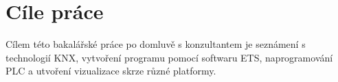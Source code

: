 \chapter*{Cíle práce}
{}

Cílem této bakalářské práce po domluvě s konzultantem je seznámení s technologií KNX, vytvoření programu pomocí softwaru ETS, naprogramování PLC a utvoření vizualizace skrze různé platformy.